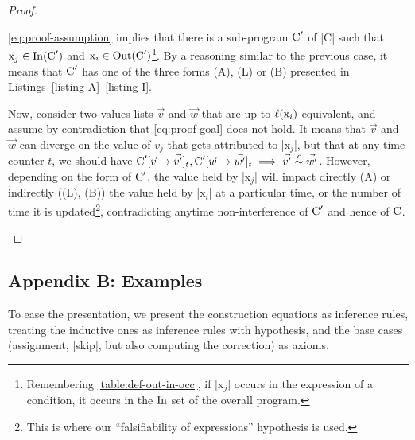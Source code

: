 \begin{proof}
\begin{description}
\autoref{eq:proof-assumption} implies that there is a sub-program \(\prc|C|'\)
of \prc|C| such that \(\prc|x$_j$| \in \In(\prc|C|')\) and \(\prc|x$_i$| \in
\Out(\prc|C|')\)\footnote{ Remembering \autoref{table:def-out-in-occ}, if
\prc|x$_j$| occurs in the expression of a condition, it occurs in the \(\operatorname{In}\)
set of the overall program.}. By a reasoning similar to the previous case, it
means that \(\prc|C|'\) has one of the three forms (A), (L) or (B) presented in
Listings~\ref{listing-A}--\ref{listing-I}.

Now, consider two values lists \(\vec{v}\) and \(\vec{w}\) that are up-to
\(\ell(\prc|x$_i$|)\) equivalent, and assume by contradiction that
\autoref{eq:proof-goal} does not hold. It means that \(\vec{v}\) and \(\vec{w}\)
can diverge on the value of \(v_j\) that gets attributed to \prc|x$_j$|, but
that at any time counter \(t\), we should have \(\prc|C|'[\vec{v} \rightarrow
\vec{v'}]_t, \prc|C|'[\vec{w} \rightarrow \vec{w'}]_t \implies
\vec{v'}\upce{\scl{c}} \vec{w'}\). However, depending on the form of
\(\prc|C|'\), the value held by \prc|x$_j$| will impact directly (A) or
indirectly ((L), (B)) the value held by \prc|x$_i$| at a particular time, or the
number of time it is updated\footnote{This is where our \enquote{falsifiability
of expressions} hypothesis is used.}, contradicting anytime non-interference of
$\prc|C|'$ and hence of $\prc|C|$.
\end{description}
\end{proof}

\subsection{Appendix B: Examples}\label{subsec:ni-examples}

To ease the presentation, we present the construction equations as inference
rules, treating the inductive ones as inference rules with hypothesis, and the
base cases (assignment, \prc|skip|, but also computing the correction) as
axioms.

